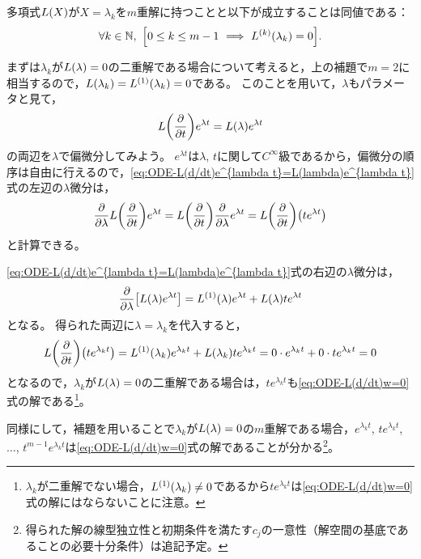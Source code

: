 \documentclass[a4paper,draft]{ltjsarticle}
\begin{document}
\begin{lem}[因数定理]
    多項式$\fun{L}{X}$が$X=\lambda_k$を$m$重解に持つことと以下が成立することは同値である：
    \begin{equation}
        \forall k \in\N,\ \bsqu{
            0\leq k\leq m-1\ \Longrightarrow\ \diffun{L}{k}{\lambda_k}=0
        }.
    \end{equation}
\end{lem}

まずは$\lambda_k$が$\fun{L}{\lambda}=0$の二重解である場合について考えると，上の補題で$m=2$に相当するので，$\fun{L}{\lambda_k}=\diffun{L}{1}{\lambda_k}=0$である。
このことを用いて，$\lambda$もパラメータと見て，
\begin{equation}
    \fun{L}{\pdiff{}{t}}e^{\lambda t}=\fun{L}{\lambda}e^{\lambda t}
    \label{eq:ODE-L(d/dt)e^{lambda t}=L(lambda)e^{lambda t}}
\end{equation}
の両辺を$\lambda$で偏微分してみよう。
$e^{\lambda t}$は$\lambda$, $t$に関して$C^\infty$級であるから，偏微分の順序は自由に行えるので，\eqref{eq:ODE-L(d/dt)e^{lambda t}=L(lambda)e^{lambda t}}式の左辺の$\lambda$微分は，
\begin{equation}
    \pdiff{}{\lambda} \fun{L}{\pdiff{}{t}}e^{\lambda t}=
    \fun{L}{\pdiff{}{t}}\pdiff{}{\lambda}e^{\lambda t}
    =\fun{L}{\pdiff{}{t}}\pare{te^{\lambda t}}
\end{equation}
と計算できる。

\eqref{eq:ODE-L(d/dt)e^{lambda t}=L(lambda)e^{lambda t}}式の右辺の$\lambda$微分は，
\begin{equation}
    \pdiff{}{\lambda}\squ{\fun{L}{\lambda}e^{\lambda t}}
    =\diffun{L}{1}{\lambda}e^{\lambda t}+\fun{L}{\lambda}te^{\lambda t}
\end{equation}
となる。
得られた両辺に$\lambda = \lambda_k$を代入すると，
\begin{equation}
    \fun{L}{\pdiff{}{t}}\pare{te^{\lambda_k t}}
    =\diffun{L}{1}{\lambda_k}e^{\lambda_k t}+\fun{L}{\lambda_k}te^{\lambda_k t}
    =0\cdot e^{\lambda_k t}+0\cdot te^{\lambda_k t}
    =0
\end{equation}
となるので，$\lambda_k$が$\fun{L}{\lambda}=0$の二重解である場合は，$te^{\lambda_k t}$も\eqref{eq:ODE-L(d/dt)w=0}式の解である\footnote{$\lambda_k$が二重解でない場合，$\diffun{L}{1}{\lambda_k}\ne0$であるから$te^{\lambda_k t}$は\eqref{eq:ODE-L(d/dt)w=0}式の解にはならないことに注意。}。

同様にして，補題を用いることで$\lambda_k$が$\fun{L}{\lambda}=0$の$m$重解である場合，$e^{\lambda_k t}$, $te^{\lambda_k t}$, $\ldots$, $t^{m-1}e^{\lambda_k t}$は\eqref{eq:ODE-L(d/dt)w=0}式の解であることが分かる\footnote{得られた解の線型独立性と初期条件を満たす$c_j$の一意性（解空間の基底であることの必要十分条件）は追記予定。}。
\end{document}
